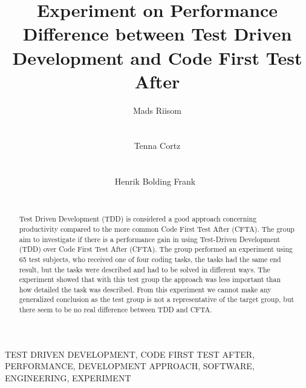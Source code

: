 \documentclass{sig-alternate-05-2015}
\begin{document}
	




\title{Experiment on Performance Difference between Test Driven Development and Code First Test After}

\author{
\alignauthor
	Mads Riisom\\
	\\
	\\
\alignauthor
	Tenna Cortz\\
	\\
	\\
\alignauthor
	Henrik Bolding Frank\
	\\
	\\
}

\maketitle
\begin{abstract}
Test Driven Development (TDD) is considered a good approach concerning productivity compared to the more common Code First Test After (CFTA). The group aim to investigate if there is a performance gain in using Test-Driven Development (TDD) over Code First Test After (CFTA). The group performed an experiment using 65 test subjects, who received one of four coding tasks, the tasks had the same end result, but the tasks were described and had to be solved in different ways.
The experiment showed that with this test group the approach was less important than how detailed the task was described.
From this experiment we cannot make any generalized conclusion as the test group is not a representative of the target group, but there seem to be no real difference between TDD and CFTA.

\end{abstract}


\begin{keywords}
TEST DRIVEN DEVELOPMENT, CODE FIRST TEST AFTER, PERFORMANCE, DEVELOPMENT APPROACH, SOFTWARE, ENGINEERING, EXPERIMENT

\end{keywords}
\end{document}
